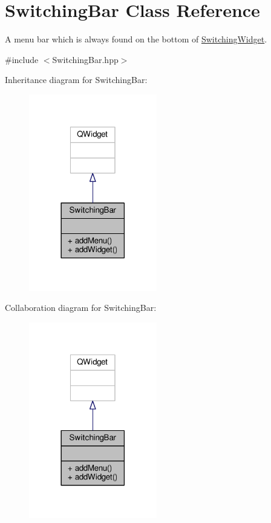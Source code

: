 \hypertarget{class_switching_bar}{}\section{Switching\+Bar Class Reference}
\label{class_switching_bar}


A menu bar which is always found on the bottom of \hyperlink{class_switching_widget}{Switching\+Widget}.  




{\ttfamily \#include $<$Switching\+Bar.\+hpp$>$}



Inheritance diagram for Switching\+Bar\+:
\nopagebreak
\begin{figure}[H]
\begin{center}
\leavevmode
\includegraphics[width=158pt]{class_switching_bar__inherit__graph}
\end{center}
\end{figure}


Collaboration diagram for Switching\+Bar\+:
\nopagebreak
\begin{figure}[H]
\begin{center}
\leavevmode
\includegraphics[width=158pt]{class_switching_bar__coll__graph}
\end{center}
\end{figure}
